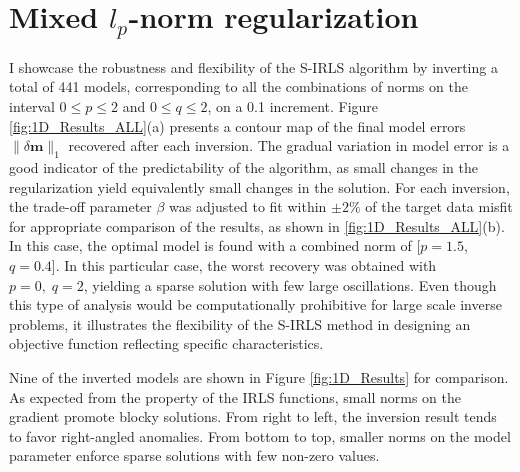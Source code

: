 \newpage
\section{Mixed $l_p$-norm regularization}
I showcase the robustness and flexibility of the S-IRLS algorithm by inverting a total of 441 models, corresponding to all the combinations of norms on the interval $0 \leq p \leq 2$ and $0 \leq q \leq 2$, on a 0.1 increment.
Figure \ref{fig:1D_Results_ALL}(a) presents a contour map of the final model errors $\|\delta\mathbf{m}\|_1$ recovered after each inversion.
The gradual variation in model error is a good indicator of the predictability of the algorithm, as small changes in the regularization yield equivalently small changes in the solution.
For each inversion, the trade-off parameter $\beta$ was adjusted to fit within $\pm 2\%$ of the target data misfit for appropriate comparison of the results, as shown in \ref{fig:1D_Results_ALL}(b). 
In this case, the optimal model is found with a combined norm of  [$p=1.5$,  $q=0.4$]. 
In this particular case, the worst recovery was obtained with $p=0,\; q=2$, yielding a sparse solution with few large oscillations.
Even though this type of analysis would be computationally prohibitive for large scale inverse problems, it illustrates the flexibility of the S-IRLS method in designing an objective function reflecting specific characteristics. 

Nine of the inverted models are shown in Figure \ref{fig:1D_Results} for comparison. 
As expected from the property of the IRLS functions, small norms on the gradient promote blocky solutions. From right to left, the inversion result tends to favor right-angled anomalies. From bottom to top, smaller norms on the model parameter enforce sparse solutions with few non-zero values.

